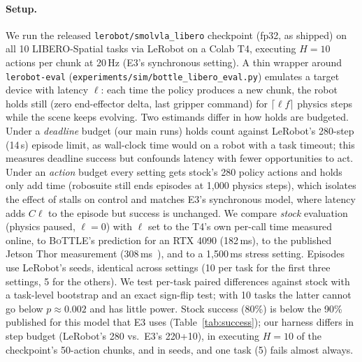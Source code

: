 \documentclass[10pt]{article}
\newcommand{\pend}[1]{\textcolor{red}{#1}}
\newcommand{\bottle}{\textsc{BoTTLE}}
\begin{document}
\paragraph{Setup.} We run the released \texttt{lerobot/smolvla\_libero} checkpoint (fp32, as
shipped) on all 10 LIBERO-Spatial tasks via LeRobot on a Colab T4, executing $H{=}10$ actions per
chunk at 20\,Hz (E3's synchronous setting). A thin wrapper around \texttt{lerobot-eval}
(\texttt{experiments/sim/bottle\_libero\_eval.py}) emulates a target device with latency $\ell$:
each time the policy produces a new chunk, the robot holds still (zero end-effector delta, last
gripper command) for $\lceil \ell f\rceil$ physics steps while the scene keeps evolving. Two
estimands differ in how holds are budgeted. Under a \emph{deadline} budget (our main runs) holds
count against LeRobot's 280-step (14\,s) episode limit, as wall-clock time would on a robot with a
task timeout; this measures deadline success but confounds latency with fewer opportunities to
act. Under an \emph{action} budget every setting gets stock's 280 policy actions and holds only
add time (robosuite still ends episodes at 1{,}000 physics steps), which isolates the effect of
stalls on control and matches E3's synchronous model, where latency adds $C\ell$ to the episode
but success is unchanged. We compare \emph{stock} evaluation (physics paused,
$\ell{=}0$) with $\ell$ set to the T4's own per-call time measured online, to \bottle's prediction
for an RTX 4090 (182\,ms), to the published Jetson Thor measurement (308\,ms~\cite{waseem2026where}),
and to a 1{,}500\,ms stress setting. Episodes use LeRobot's seeds, identical across settings
(10 per task for the first three settings, 5 for the others). We test per-task paired
differences against stock with a task-level bootstrap and an exact sign-flip test; with 10 tasks
the latter cannot go below $p{\approx}0.002$ and has little power. Stock success (80\%) is below
the 90\% published for this model that E3 uses (Table~\ref{tab:success}); our harness differs in
step budget (LeRobot's 280 vs.\ E3's 220+10), in executing $H{=}10$ of the checkpoint's 50-action
chunks, and in seeds, and one task (5) fails almost always.

\begin{table}[t]\centering\small
\caption{Closed-loop LIBERO-Spatial success of SmolVLA ($H{=}10$, synchronous) with each chunk's
inference latency emulated as robot holds, under the deadline budget. Success CIs are Wilson
intervals, which treat episodes as independent; $\Delta$ is the mean
per-task paired difference from stock on the same tasks (task bootstrap CI; the RTX 4090's
total is over all 10 tasks, its paired difference over the 7 with per-task logs). \emph{Max
actions} is the most policy actions executed before the 280-step deadline once holds are charged
against it. Latency is the setting's emulated value; for the T4 it is the median of the 10
task medians of the measured run (the text's 624\,ms pools all runs).
\pend{Action-budget rows (630\,ms, 1{,}500\,ms) pending.}}\label{tab:sim}
\resizebox{\linewidth}{!}{}
\end{table}
\end{document}
